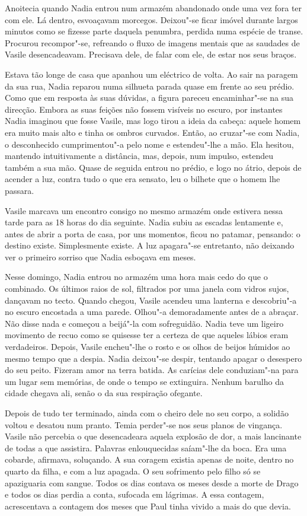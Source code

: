 Anoitecia quando Nadia entrou num armazém abandonado onde uma vez fora
ter com ele. Lá dentro, esvoaçavam morcegos. Deixou"-se ficar imóvel
durante largos minutos como se fizesse parte daquela penumbra, perdida
numa espécie de transe. Procurou recompor"-se, refreando o fluxo de
imagens mentais que as saudades de Vasile desencadeavam. Precisava dele,
de falar com ele, de estar nos seus braços.

Estava tão longe de casa que apanhou um eléctrico de volta. Ao sair na
paragem da sua rua, Nadia reparou numa silhueta parada quase em frente
ao seu prédio. Como que em resposta às suas dúvidas, a figura pareceu
encaminhar"-se na sua direcção. Embora as suas feições não fossem
visíveis no escuro, por instantes Nadia imaginou que fosse Vasile, mas
logo tirou a ideia da cabeça: aquele homem era muito mais alto e tinha
os ombros curvados. Então, ao cruzar"-se com Nadia, o desconhecido
cumprimentou"-a pelo nome e estendeu"-lhe a mão. Ela hesitou, mantendo
intuitivamente a distância, mas, depois, num impulso, estendeu também a
sua mão. Quase de seguida entrou no prédio, e logo no átrio, depois de
acender a luz, contra tudo o que era sensato, leu o bilhete que o
homem lhe passara.

Vasile marcava um encontro consigo no mesmo armazém onde estivera nessa tarde para as 18 horas do dia seguinte. Nadia
subiu as escadas lentamente e, antes de abrir a porta de casa, por uns
momentos, ficou no patamar, pensando: o destino existe. Simplesmente
existe. A luz apagara"-se entretanto, não deixando ver o primeiro sorriso
que Nadia esboçava em meses.

Nesse domingo, Nadia entrou no armazém uma hora mais cedo do que o
combinado. Os últimos raios de sol, filtrados por uma janela com vidros
sujos, dançavam no tecto. Quando chegou, Vasile acendeu uma lanterna e
descobriu"-a no escuro encostada a uma parede. Olhou"-a demoradamente
antes de a abraçar. Não disse nada e começou a beijá"-la com sofreguidão.
Nadia teve um ligeiro movimento de recuo como se quisesse ter a certeza
de que aqueles lábios eram verdadeiros. Depois, Vasile encheu"-lhe o
rosto e os olhos de beijos húmidos ao mesmo tempo que a despia. Nadia
deixou"-se despir, tentando apagar o desespero do seu peito. Fizeram
amor na terra batida. As carícias dele conduziam"-na para um lugar sem
memórias, de onde o tempo se extinguira. Nenhum barulho da cidade
chegava ali, senão o da sua respiração ofegante.

Depois de tudo ter terminado, ainda com o cheiro dele
no seu corpo, a solidão voltou e desatou num pranto. Temia perder"-se nos
seus planos de vingança. Vasile não percebia o que desencadeara aquela
explosão de dor, a mais lancinante de todas a que assistira. Palavras
enlouquecidas saíam"-lhe da boca. Era uma cobarde, afirmava, soluçando.
A sua coragem existia apenas de noite, dentro no quarto da filha, e com
a luz apagada. O seu sofrimento pelo filho só se apaziguaria com sangue.
Todos os dias contava os meses desde a morte de Drago e todos os dias
perdia a conta, sufocada em lágrimas. A essa contagem, acrescentava a
contagem dos meses que Paul tinha vivido a mais do que devia.

